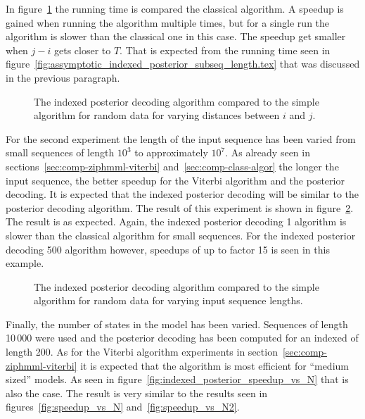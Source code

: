 In figure~\ref{fig:indexed_posterior_speedup_vs_subseq} the running time is
compared the classical algorithm. A speedup is gained when running the
algorithm multiple times, but for a single run the algorithm is slower than the
classical one in this case. The speedup get smaller when $j - i$ gets closer to
$T$. That is expected from the running time seen in
figure~\ref{fig:assymptotic_indexed_posterior_subseq_length.tex} that was
discussed in the previous paragraph.

\begin{figure}
  \centering
  
  \caption{The indexed posterior decoding algorithm compared to the simple
    algorithm for random data for varying distances between $i$ and $j$.}
  \label{fig:indexed_posterior_speedup_vs_subseq}
\end{figure}

For the second experiment the length of the input sequence has been varied from
small sequences of length $10^3$ to approximately $10^7$. As already seen in
sections~\ref{sec:comp-ziphmml-viterbi} and~\ref{sec:comp-class-algor} the
longer the input sequence, the better speedup for the Viterbi algorithm and the
posterior decoding. It is expected that the indexed posterior
decoding will be similar to the posterior decoding algorithm. The
result of this experiment is shown in
figure~\ref{fig:indexed_posterior_speedup_vs_T}. The result is as
expected. Again, the indexed posterior decoding 1 algorithm is slower than
the classical algorithm for small sequences. For the indexed posterior
decoding 500 algorithm however, speedups of up to factor 15 is seen in this
example.

\begin{figure}
  \centering
  
  \caption{The indexed posterior decoding algorithm compared to the simple
    algorithm for random data for varying input sequence lengths.}
  \label{fig:indexed_posterior_speedup_vs_T}
\end{figure}

Finally, the number of states in the model has been varied. Sequences of length
10\,000 were used and the posterior decoding has been computed for an indexed of
length 200. As for the Viterbi algorithm experiments in
section~\ref{sec:comp-ziphmml-viterbi} it is expected that the algorithm is
most efficient for ``medium sized'' models. As seen in
figure~\ref{fig:indexed_posterior_speedup_vs_N} that is also the case. The
result is very similar to the results seen in figures~\ref{fig:speedup_vs_N}
and~\ref{fig:speedup_vs_N2}.

